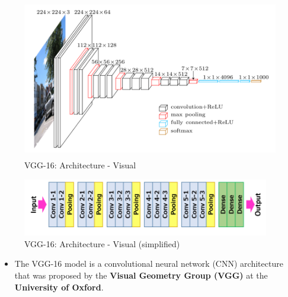 \begin{figure}[h]
    \centering
    \includegraphics[width=\linewidth, height=7cm, keepaspectratio]{Pictures/convolutional-neural-network/vgg-16-1.png}
    \caption{VGG-16: Architecture - Visual}
\end{figure}
\begin{figure}[h]
    \centering
    \includegraphics[width=\linewidth, height=2.5cm, keepaspectratio]{Pictures/convolutional-neural-network/vgg-16-2.png}
    \caption{VGG-16: Architecture - Visual (simplified)}
\end{figure}

\begin{itemize}
    \item The VGG-16 model is a convolutional neural network (CNN) architecture that was proposed by the \textbf{Visual Geometry Group (VGG)} at the \textbf{University of Oxford}.
\end{itemize}

